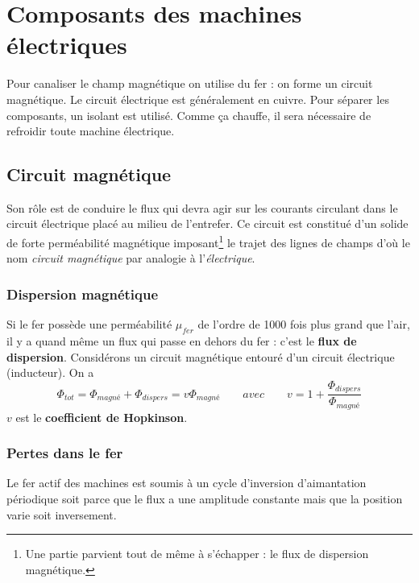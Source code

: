 \section{Composants des machines électriques}
Pour canaliser le champ magnétique on utilise du fer : on forme un circuit 
magnétique. Le circuit électrique est généralement en cuivre. Pour séparer les composants, un isolant 
est utilisé. Comme ça chauffe, il sera nécessaire de refroidir toute machine 
électrique.

	\subsection{Circuit magnétique}
	Son rôle est de conduire le flux qui devra agir sur les courants circulant 
	dans le circuit électrique placé au milieu de l'entrefer. Ce circuit est 
	constitué d'un solide de forte perméabilité magnétique imposant\footnote{Une 
	partie parvient tout de même à s'échapper : le flux de dispersion magnétique.} 
	le trajet des lignes de champs d'où le nom \textit{circuit magnétique} par analogie 
	à l'\textit{électrique}.
	
	\subsubsection{Dispersion magnétique}
	Si le fer possède une perméabilité $\mu _{fer}$ de l'ordre de 1000 fois plus grand que l'air, il y a quand même un flux qui passe en dehors du fer : c'est le \textbf{flux de dispersion}. Considérons un circuit magnétique entouré d'un circuit électrique (inducteur). On a 
	\begin{equation}
		\Phi _{tot} = \Phi _{magné} + \Phi _{dispers} = v \Phi _{magné} \qquad avec \qquad v = 1+\frac{\Phi_{dispers}}{\Phi _{magné}}
	\end{equation}
	$v$ est le \textbf{coefficient de Hopkinson}.
	
	\subsubsection{Pertes dans le fer}
	Le fer actif des machines est soumis à un cycle d'inversion d'aimantation périodique soit parce que le flux a une amplitude constante mais que la position varie soit inversement. \\
	
